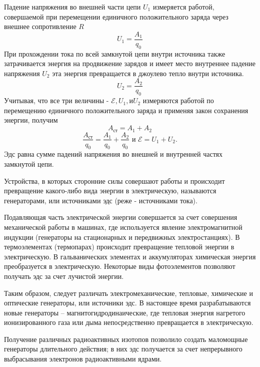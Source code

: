 \documentclass[a4paper,10pt]{book}
\begin{document}
Падение напряжения во внешней части цепи $U_1$ измеряется работой, совершаемой при перемещении единичного положительного заряда через внешнее сопротивление $R$
\begin{equation}\label{u1}
 U_1 = \frac{A_1}{q_0}
\end{equation}
При прохождении тока по всей замкнутой цепи внутри источника также затрачивается энергия на продвижение зарядов и имеет место внутреннее падение напряжения $U_2$ эта энергия превращается в джоулево тепло внутри источника.
\begin{equation}\label{u2}
 U_2 = \frac{A_2}{q_0}
\end{equation}
Учитывая, что все три величины - $\mathcal{E}, U_1, \text{и} U_2$ измеряются работой по перемещению единичного положительного заряда и применяя закон сохранения энергии, получим
\begin{equation}\label{Aex}
 A_\text{ст} = A_1 + A_2
\end{equation}
\begin{equation}\label{Aex/q0}
 \frac{A_\text{ст}}{q_0} = \frac{A_1}{q_0} + \frac{A_2}{q_0} \text{ и } \mathcal{E} = U_1 + U_2.
\end{equation}
Эдс равна сумме падений напряжения во внешней и внутренней частях замкнутой цепи.

Устройства, в которых сторонние силы совершают работы и происходит превращение какого-либо вида энергии в электрическую, называются генераторами, или источниками эдс (реже - источниками тока).

Подавляющая часть электрической энергии совершается за счет совершения механической работы в машинах, где используется явление электромагнитной индукции (генераторы на стационарных и передвижных электростанциях). В термоэлементах (термопарах) происходит превращение тепловой энергии в электрическую. В гальванических элементах и аккумуляторах химическая энергия преобразуется в электрическую. Некоторые виды фотоэлементов позволяют получать эдс за счет лучистой энергии.

Таким образом, следует различать электромеханические, тепловые, химические и оптические генераторы, или источники эдс. В настоящее время разрабатываются новые генераторы -- магнитогидродинаические, где тепловая энергия нагретого ионизированного газа или дыма непосредственно превращается в электрическую.

Получение различных радиоактивных изотопов позволило создать маломощные генераторы длительного действия; в них эдс получается за счет непрерывного выбрасывания электронов радиоактивными ядрами.
\end{document}
